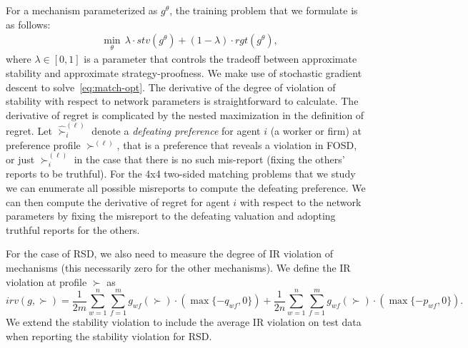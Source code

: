 \documentclass[11pt,letterpaper]{article}
\theoremstyle{definition}
\newcommand{\kibitz}[2]{\ifnum\Comments=1{\color{#1}{#2}}\fi}
\newcommand{\dcp}[1]{\kibitz{orange}{[DCP: #1]}}
\newcommand{\dcpadd}[1]{{#1}}
\begin{document}
 For a mechanism parameterized as $g^\theta$, the training problem  that we formulate is as follows:
  \begin{align}
  &\min_{\theta}\, \lambda \cdot \mathit{stv}(g^\theta) + (1 - \lambda) \cdot \mathit{rgt}(g^\theta),
  \label{eq:match-opt}
  \end{align}
  where $\lambda \in [0, 1]$ is a parameter that controls the tradeoff between approximate stability and approximate strategy-proofness.
%
We make
  use of stochastic gradient descent to  solve~\eqref{eq:match-opt}.
  The derivative of the degree of violation of stability with respect to
  network parameters is straightforward to calculate. 
%
The derivative of regret is complicated by the nested maximization in the definition of regret.
\dcpadd{Let $\hat{\succ}^{(\ell)}_i$ denote a {\em defeating preference} for agent $i$ (a worker or firm) at preference profile $\succ^{(\ell)}$, that is  a preference that
reveals a violation in FOSD,
%
%
or just
$\succ_i^{(\ell)}$ in the case that there is no
such mis-report (fixing  the
others' reports to be truthful). }
%
For the 4x4 two-sided matching problems
that we study we can enumerate all possible misreports 
to compute the defeating preference. 
%
%
We can then compute the derivative of regret for agent $i$ with respect to the network parameters by fixing the misreport to the defeating valuation and adopting truthful reports for the others.

For the case of RSD, we also need to measure the degree of IR violation of mechanisms (this necessarily zero for the other mechanisms).  We define the IR violation 
at profile $\succ$ as
\[\mathit{irv}(g, \succ) =   \frac{1}{2m}\sum_{w = 1}^{n}\sum_{f = 1}^{m} g_{wf}(\succ)\cdot \left(\max\{-q_{wf}, 0\}\right) + \frac{1}{2n}\sum_{w = 1}^{n}\sum_{f = 1}^{m} g_{wf}(\succ)\cdot \left(\max\{-p_{wf}, 0\}\right).\]
%
%
We extend the stability violation to include  the average IR violation on test data when reporting the stability violation for RSD.
\end{document}
